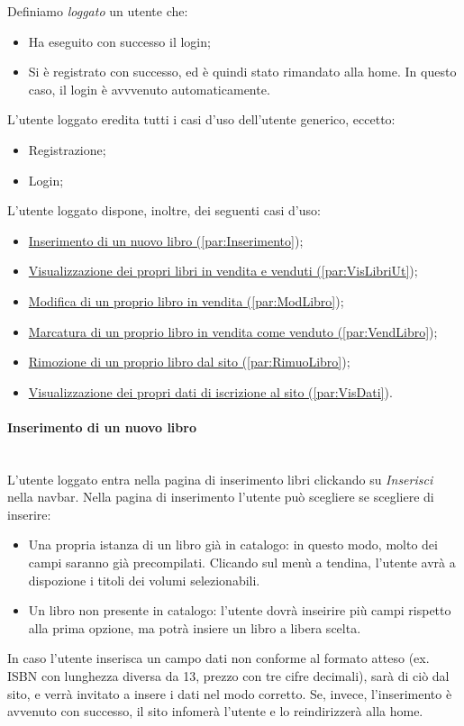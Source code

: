 Definiamo \textit{loggato} un utente che:
\begin{itemize}
	\item Ha eseguito con successo il login;
	\item Si è registrato con successo, ed è quindi stato rimandato alla home. In questo caso, il login è avvvenuto automaticamente.
\end{itemize}

L'utente loggato eredita tutti i casi d'uso dell'utente generico, eccetto:
\begin{itemize}
	\item Registrazione;
	\item Login;
\end{itemize}

L'utente loggato dispone, inoltre, dei seguenti casi d'uso:
\begin{itemize}
	\item \hyperref[par:Inserimento]{Inserimento di un nuovo libro (\ref{par:Inserimento}});
	\item \hyperref[par:VisLibriUt]{Visualizzazione dei propri libri in vendita e venduti (\ref{par:VisLibriUt}});
	\item \hyperref[par:ModLibro]{Modifica di un proprio libro in vendita (\ref{par:ModLibro}});
	\item \hyperref[par:VendLibro]{Marcatura di un proprio libro in vendita come venduto (\ref{par:VendLibro}});
	\item \hyperref[par:RimuoLibro]{Rimozione di un proprio libro dal sito (\ref{par:RimuoLibro}});
	\item \hyperref[par:VisDati]{Visualizzazione dei propri dati di iscrizione al sito (\ref{par:VisDati}}).
\end{itemize}

\paragraph{Inserimento di un nuovo libro}\mbox{}\\
\label{par:Inserimento}
L'utente loggato entra nella pagina di inserimento libri clickando su \textit{Inserisci} nella navbar. Nella pagina di inserimento l'utente può scegliere se scegliere di inserire:
\begin{itemize}
	\item Una propria istanza di un libro già in catalogo: in questo modo, molto dei campi saranno già precompilati. Clicando sul menù a tendina, l'utente avrà a dispozione i titoli dei volumi selezionabili.
	\item Un libro non presente in catalogo: l'utente dovrà inseirire più campi rispetto alla prima opzione, ma potrà insiere un libro a libera scelta.
\end{itemize}
In caso l'utente inserisca un campo dati non conforme al formato atteso (ex. ISBN con lunghezza diversa da 13, prezzo con tre cifre decimali), sarà di ciò dal sito, e verrà invitato a insere i dati nel modo corretto.
Se, invece, l'inserimento è avvenuto con successo, il sito infomerà l'utente e lo reindirizzerà alla home.

